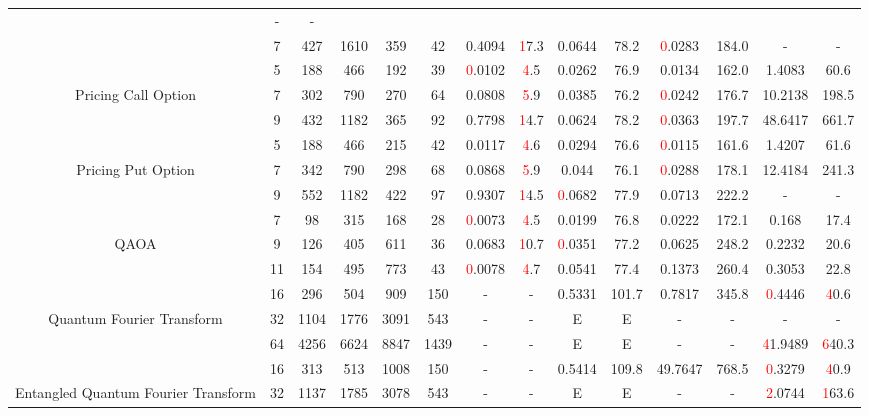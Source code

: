 \begin{table}[htb]
{\begin{tabular}{|c|c|c|c|c|c|c|c|c|c|c|c|c|c|}
 & - & -
 \\
 & 
7 & 427 & 1610 & 359 & 42
 & 0.4094 & \textcolor{red}17.3
 & 0.0644 & 78.2
 & \textcolor{red}0.0283 & 184.0
 & - & -
 \\
\hline
 & 
5 & 188 & 466 & 192 & 39
 & \textcolor{red}0.0102 & \textcolor{red}4.5
 & 0.0262 & 76.9
 & 0.0134 & 162.0
 & 1.4083 & 60.6
 \\
Pricing Call Option & 
7 & 302 & 790 & 270 & 64
 & 0.0808 & \textcolor{red}5.9
 & 0.0385 & 76.2
 & \textcolor{red}0.0242 & 176.7
 & 10.2138 & 198.5
 \\
 & 
9 & 432 & 1182 & 365 & 92
 & 0.7798 & \textcolor{red}14.7
 & 0.0624 & 78.2
 & \textcolor{red}0.0363 & 197.7
 & 48.6417 & 661.7
 \\
\hline
 & 
5 & 188 & 466 & 215 & 42
 & 0.0117 & \textcolor{red}4.6
 & 0.0294 & 76.6
 & \textcolor{red}0.0115 & 161.6
 & 1.4207 & 61.6
 \\
Pricing Put Option & 
7 & 342 & 790 & 298 & 68
 & 0.0868 & \textcolor{red}5.9
 & 0.044 & 76.1
 & \textcolor{red}0.0288 & 178.1
 & 12.4184 & 241.3
 \\
 & 
9 & 552 & 1182 & 422 & 97
 & 0.9307 & \textcolor{red}14.5
 & \textcolor{red}0.0682 & 77.9
 & 0.0713 & 222.2
 & - & -
 \\
\hline
 & 
7 & 98 & 315 & 168 & 28
 & \textcolor{red}0.0073 & \textcolor{red}4.5
 & 0.0199 & 76.8
 & 0.0222 & 172.1
 & 0.168 & 17.4
 \\
QAOA & 
9 & 126 & 405 & 611 & 36
 & 0.0683 & \textcolor{red}10.7
 & \textcolor{red}0.0351 & 77.2
 & 0.0625 & 248.2
 & 0.2232 & 20.6
 \\
 & 
11 & 154 & 495 & 773 & 43
 & \textcolor{red}0.0078 & \textcolor{red}4.7
 & 0.0541 & 77.4
 & 0.1373 & 260.4
 & 0.3053 & 22.8
 \\
\hline
 & 
16 & 296 & 504 & 909 & 150
 & - & -
 & 0.5331 & 101.7
 & 0.7817 & 345.8
 & \textcolor{red}0.4446 & \textcolor{red}40.6
 \\
Quantum Fourier Transform & 
32 & 1104 & 1776 & 3091 & 543
 & - & -
 & E & E
 & - & -
 & - & -
 \\
 & 
64 & 4256 & 6624 & 8847 & 1439
 & - & -
 & E & E
 & - & -
 & \textcolor{red}41.9489 & \textcolor{red}640.3
 \\
\hline
 & 
16 & 313 & 513 & 1008 & 150
 & - & -
 & 0.5414 & 109.8
 & 49.7647 & 768.5
 & \textcolor{red}0.3279 & \textcolor{red}40.9
 \\
Entangled Quantum Fourier Transform & 
32 & 1137 & 1785 & 3078 & 543
 & - & -
 & E & E
 & - & -
 & \textcolor{red}2.0744 & \textcolor{red}163.6

\end{tabular}}
\end{table}
